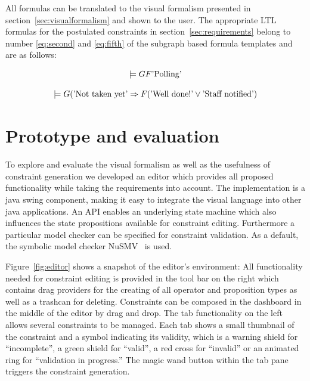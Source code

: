 \documentclass[conference]{IEEEtran}
\begin{document}
All formulas can be translated to the visual formalism presented in section~\ref{sec:visualformalism} and shown to the user. The appropriate LTL formulas for the postulated constraints in section~\ref{sec:requirements} belong to number \ref{eq:second} and \ref{eq:fifth} of the subgraph based formula templates and are as follows:

\begin{equation}
  \models G F \textnormal{'Polling'}
\end{equation}

\begin{equation}
	\models G (\textnormal{'Not taken yet'} \Rightarrow F (\textnormal{'Well done!'} \vee \textnormal{'Staff notified'})
\end{equation}


\section{Prototype and evaluation}

To explore and evaluate the visual formalism as well as the usefulness of constraint generation we developed an editor which provides all proposed functionality while taking the requirements into account.
The implementation is a java swing component, making it easy to integrate the visual language into other java applications. An API enables an underlying state machine which also influences the state propositions available for constraint editing. Furthermore a particular model checker can be specified for constraint validation. As a default, the symbolic model checker NuSMV~\cite{springerlink:10.1007/s100090050046,NuSMV2} is used.

Figure~\ref{fig:editor} shows a snapshot of the editor's environment: All functionality needed for constraint editing is provided in the tool bar on the right which contains drag providers for the creating of all operator and proposition types as well as a trashcan for deleting. Constraints can be composed in the dashboard in the middle of the editor by drag and drop. The tab functionality on the left allows several constraints to be managed. Each tab shows a small thumbnail of the constraint and a symbol indicating its validity, which is a warning shield for ``incomplete'', a green shield for ``valid'', a red cross for ``invalid'' or an animated ring for ``validation in progress.'' The magic wand button within the tab pane triggers the constraint generation.
\end{document}
